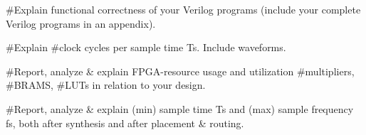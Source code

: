 #Explain functional correctness of your Verilog programs (include your complete Verilog programs in an appendix).

#Explain #clock cycles per sample time Ts. Include waveforms.

#Report, analyze & explain FPGA-resource usage and utilization {#multipliers, #BRAMS, #LUTs} in relation to your design.

#Report, analyze & explain (min) sample time Ts and (max) sample frequency fs, both after synthesis and after placement & routing.
